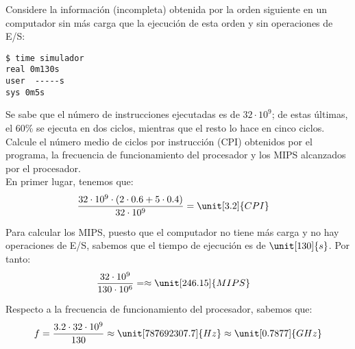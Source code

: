 \begin{ejercicio}\label{ej:4.3}
Considere la información (incompleta) obtenida por la orden siguiente en un computador sin más carga que la ejecución de esta orden y sin operaciones de E/S:
\begin{verbatim}
$ time simulador
real 0m130s
user  -----s
sys 0m5s
\end{verbatim}
Se sabe que el número de instrucciones ejecutadas es de $32 \cdot 10^9$; de estas últimas, el 60\% se ejecuta en dos ciclos, mientras que el resto lo hace en cinco ciclos. Calcule el número medio de ciclos por instrucción (CPI) obtenidos por el programa, la frecuencia de funcionamiento del procesador y los MIPS alcanzados por el procesador.\\

En primer lugar, tenemos que:
\begin{align*}
    \dfrac{32\cdot 10^9\cdot (2\cdot 0.6 + 5\cdot 0.4)}{32\cdot 10^9} &= \unit[3.2]{CPI}
\end{align*}

Para calcular los MIPS, puesto que el computador no tiene más carga y no hay operaciones de E/S, sabemos que el tiempo de ejecución es de $\unit[130]{s}$. Por tanto:
\begin{align*}
    \dfrac{32\cdot 10^9}{130\cdot 10^6} &= \approx \unit[246.15]{MIPS}
\end{align*}

Respecto a la frecuencia de funcionamiento del procesador, sabemos que:
\begin{align*}
    f = \dfrac{3.2\cdot 32\cdot 10^9}{130}\approx \unit[787692307.7]{Hz}\approx \unit[0.7877]{GHz}
\end{align*}

\end{ejercicio}
\begin{comment}Sol:
El programa obtiene un CPI de 3,2 y 246,2 MIPS. La frecuencia del procesador es de 0,788 GHz.
\end{comment}

